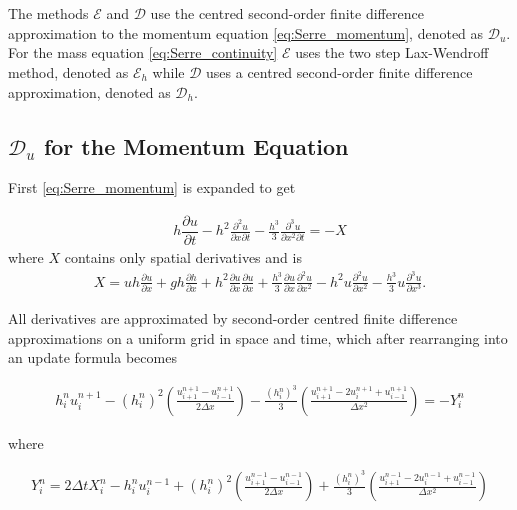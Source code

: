 \documentclass[times]{elsarticle}
\begin{document}
\section{}
The methods $\mathcal{E}$ and $\mathcal{D}$ use the centred second-order finite difference approximation to the momentum equation \eqref{eq:Serre_momentum}, denoted as $\mathcal{D}_u$. For the mass equation \eqref{eq:Serre_continuity} $\mathcal{E}$ uses the two step Lax-Wendroff method, denoted as $\mathcal{E}_h$ while $\mathcal{D}$ uses a centred second-order finite difference approximation, denoted as $\mathcal{D}_h$.
\subsection{$\mathcal{D}_u$ for the Momentum Equation}
First \eqref{eq:Serre_momentum} is expanded to get
\begin{linenomath*}
		\begin{gather*}
		h\dfrac{\partial u}{\partial t} - h^2\frac{\partial^2 u}{\partial x \partial t} - \frac{h^3}{3}\frac{\partial^3 u}{\partial x^2 \partial t}  = -X 
		\label{eq:expandedu}
		\end{gather*}
		where $X$ contains only spatial derivatives and is
		\begin{gather*}
		X = uh\frac{\partial u}{\partial x} + gh\frac{\partial h}{\partial x} + h^2\frac{\partial u}{\partial x}\frac{\partial u}{\partial x} + \frac{h^3}{3}\frac{\partial u}{\partial x}\frac{\partial^2 u}{\partial x^2} - h^2u\frac{\partial^2 u}{\partial x^2}- \frac{h^3}{3}u\frac{\partial^3 u}{\partial x^3} .
		\end{gather*}
\end{linenomath*}
All derivatives are approximated by second-order centred finite difference approximations on a uniform grid in space and time, which after rearranging into an update formula becomes
\begin{linenomath*}
	\begin{gather}
	h^{n}_iu^{n+1}_i - \left(h^{n}_i\right)^2 \left(\frac{u^{n+1}_{i+1} -u^{n+1}_{i-1} }{2 \Delta x}\right) - \frac{\left(h^{n}_i\right)^3}{3}\left(\frac{u^{n+1}_{i+1} - 2u^{n+1}_{i} + u^{n+1}_{i-1} }{\Delta x^2}\right) = - Y^n_i
	\label{eq:expandedutdisc3}
	\end{gather}
\end{linenomath*}
where
\begin{linenomath*}
	\begin{gather*}
	Y_i^n = 2\Delta tX_i^{n} - h_i^{n}u_i^{n-1} + \left(h_i^{n}\right)^2\left(\frac{u^{n-1}_{i+1} -u^{n-1}_{i-1} }{2 \Delta x}\right) + \frac{\left(h_i^{n}\right)^3}{3}\left(\frac{u^{n-1}_{i+1} - 2u^{n-1}_{i} + u^{n-1}_{i-1} }{\Delta x^2}\right)
	\label{eq:expandfactor Xp}
	\end{gather*}
\end{linenomath*}
\end{document}
